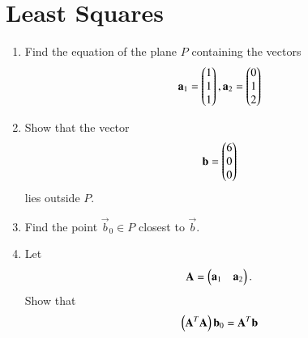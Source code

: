 \documentclass[journal,12pt,twocolumn]{IEEEtran}
\renewcommand\thesection{\arabic{section}}
\begin{document}
\section{Least Squares}
\begin{enumerate}[label=\thesection.\arabic*
,ref=\thesection.\theenumi]
\item Find the equation of the plane $P$
containing the vectors 
%
\begin{align}
\mathbf{a}_1 = \begin{pmatrix}1 \\ 1 \\ 1\end{pmatrix}
,
\mathbf{a}_2 = \begin{pmatrix}0 \\ 1 \\ 2\end{pmatrix}
\end{align}
%
\item Show that the vector 
\begin{align}
\mathbf{b} = \begin{pmatrix}6 \\ 0 \\ 0\end{pmatrix}
\end{align}
lies outside $P$.
\item Find the point $\vec{b}_0 \in P$ closest to $\vec{b}$.
\item Let 
\begin{align}
\mathbf{A} = \begin{pmatrix}\mathbf{a}_1 & \mathbf{a}_2\end{pmatrix}.
\end{align}
Show that 
\begin{align}
\left(\mathbf{A}^T\mathbf{A}\right)\mathbf{b}_0=\mathbf{A}^T\mathbf{b}
\end{align}

\end{enumerate}
\end{document}
